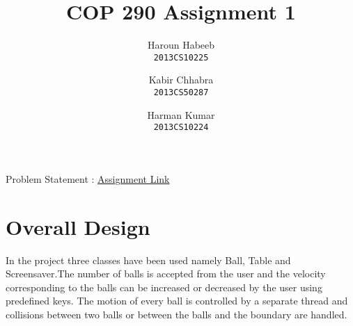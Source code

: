 \documentclass[]{article}
\begin{document}
\author{
  Haroun Habeeb\\
  \texttt{2013CS10225}
  \and
  Kabir Chhabra\\
  \texttt{2013CS50287}
  \and
  Harman Kumar\\
  \texttt{2013CS10224}
}

\title{COP 290 Assignment 1}
\maketitle


\begin{center}
Problem Statement : \href { http://www.cse.iitd.ac.in/~prathmesh/ta/COP290/ass1.html }{Assignment Link}
\end{center}

\section{Overall Design}
\begin{flushleft}
In the project three classes have been used namely Ball, Table and Screensaver.The number of balls is accepted from the user and the velocity corresponding to the balls can be increased or decreased by the user using predefined keys. The motion of every ball is controlled by a separate thread and collisions between two balls or between the balls and the boundary are handled.
\end{flushleft} 
\end{document}
